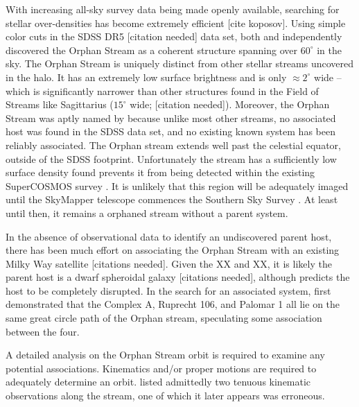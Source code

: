 \documentclass{emulateapj}
\begin{document}
  
With increasing all-sky survey data being made openly available, searching for stellar over-densities has become extremely efficient [cite koposov]. Using simple color cuts in the SDSS DR5 [citation needed] data set, both \citet{Grillmair_2006} and \citet{Belokurov;et-al_2007} independently discovered the Orphan Stream as a coherent structure spanning over $60^\circ$ in the sky. The Orphan Stream is uniquely distinct from  other stellar streams uncovered in the halo. It has an extremely low surface brightness and is only $\approx2^\circ$ wide \--- which is significantly narrower than other structures found in the Field of Streams \citep{Belokurov;et-al_2006} like Sagittarius ($15^\circ$ wide; [citation needed]). Moreover, the Orphan Stream was aptly named by \citet{Belokurov;et-al_2007} because unlike most other streams, no associated host was found in the SDSS data set, and no existing known system has been reliably associated. The Orphan stream extends well past the celestial equator, outside of the SDSS footprint. Unfortunately the stream has a sufficiently low surface density \citet{Newberg;et-al_2010} found prevents it from being detected within the existing SuperCOSMOS survey \citep{Hambly;et-al_2001}. It is unlikely that this region will be adequately imaged until the SkyMapper telescope commences the Southern Sky Survey \citep{Keller;et-al_2007}. At least until then, it remains a orphaned stream without a parent system.
  

In the absence of observational data to identify an undiscovered parent host, there has been much effort on associating the Orphan Stream with an existing Milky Way satellite [citations needed]. Given the XX and XX, it is likely the parent host is a dwarf spheroidal galaxy [citations needed], although \citet{Grillmair_2006} predicts the host to be completely disrupted. In the search for an associated system, \citet{Belokurov;et-al_2007} first demonstrated that the Complex A, Ruprecht 106, and Palomar 1 all lie on the same great circle path of the Orphan stream, speculating some association between the four. 

A detailed analysis on the Orphan Stream orbit is required to examine any potential associations. Kinematics and/or proper motions are required to adequately determine an orbit.
\citet{Belokurov;et-al_2007} listed admittedly two tenuous kinematic observations along the stream, one of which it later appears was erroneous. 
\end{document}
